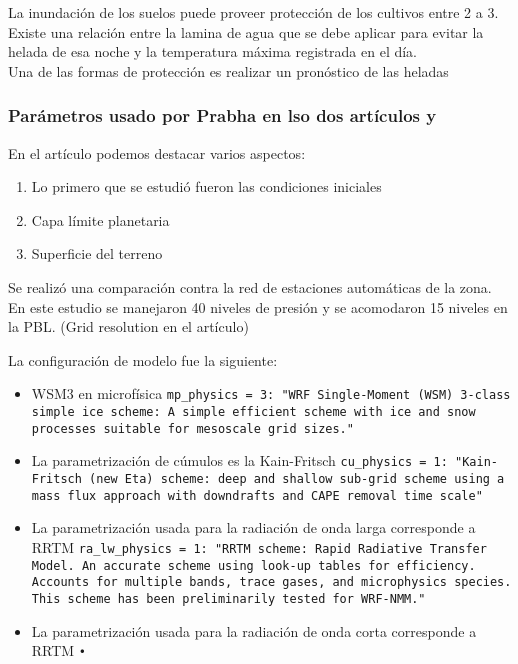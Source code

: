 La inundación de los suelos puede proveer protección de los cultivos entre 2 a 3\celc. Existe una relación entre la lamina de agua que se debe aplicar para evitar la helada de esa noche y la temperatura máxima registrada en el día.\\

Una de las formas de protección es realizar un pronóstico de las heladas

\subsubsection{Parámetros usado por Prabha en lso dos artículos \citep{prabha2008} y \citep{prabha2008evaluation}}


En el artículo \citet{prabha2008} podemos destacar varios aspectos:

\begin{enumerate}
\item Lo primero que se estudió fueron las condiciones iniciales
\item Capa límite planetaria
\item Superficie del terreno
\end{enumerate}

Se realizó una comparación contra la red de estaciones automáticas de la zona. En este estudio se manejaron 40 niveles de presión y se acomodaron 15 niveles en la PBL. (Grid resolution en el artículo)


La configuración de modelo fue la siguiente:

\begin{itemize}
\item WSM3 en microfísica \texttt{mp\_physics = 3: "WRF Single-Moment (WSM) 3-class simple ice scheme: A simple efficient scheme with ice and snow processes suitable for mesoscale grid sizes."}
\item La parametrización de cúmulos es la Kain-Fritsch \texttt{cu\_physics = 1: "Kain-Fritsch (new Eta) scheme: deep and shallow sub-grid scheme using a mass flux approach with downdrafts and CAPE removal time scale"}

\item La parametrización usada para la radiación de onda larga corresponde a RRTM \texttt{ra\_lw\_physics = 1: "RRTM scheme: Rapid Radiative Transfer Model. An accurate scheme using look-up tables for efficiency. Accounts for multiple bands, trace gases, and microphysics species. This scheme has been preliminarily tested for WRF-NMM."}

\item La parametrización usada para la radiación de onda corta corresponde a RRTM \texttt{•}
\end{itemize}


